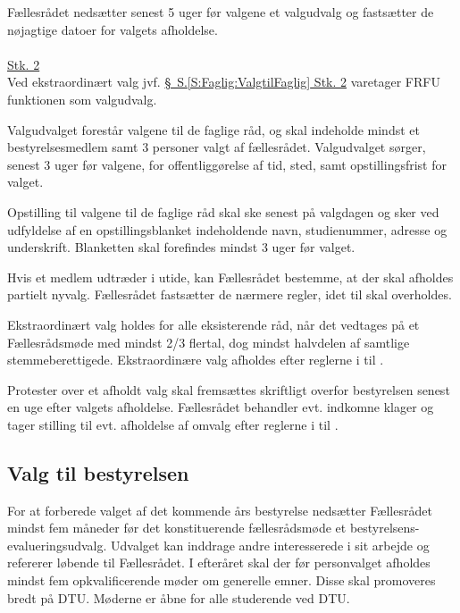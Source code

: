 \begin{list}
\item \label{S:Faglig:Valgudvalg} Fællesrådet nedsætter senest 5 uger før valgene et valgudvalg og fastsætter de nøjagtige datoer for valgets afholdelse.\\
\\
\underline{Stk. 2}\\
Ved ekstraordinært valg jvf. \hyperref[S:Faglig:ValgtilFaglig]{\S \ S.\ref*{S:Faglig:ValgtilFaglig} Stk. 2} varetager FRFU funktionen som valgudvalg.\\

\item Valgudvalget forestår valgene til de faglige råd, og skal indeholde mindst et bestyrelsesmedlem samt 3 personer valgt af fællesrådet. Valgudvalget sørger, senest 3 uger før valgene, for offentliggørelse af tid, sted, samt opstillingsfrist for valget.

\item \label{S:Faglig:Blanket} Opstilling til valgene til de faglige råd skal ske senest på valgdagen og sker ved udfyldelse af en opstillingsblanket indeholdende navn, studienummer, adresse og underskrift. Blanketten skal forefindes mindst 3 uger før valget.

\item Hvis et medlem udtræder i utide, kan Fællesrådet bestemme, at der skal afholdes partielt nyvalg. Fællesrådet fastsætter de nærmere regler, idet  til  skal overholdes.\\

\item Ekstraordinært valg holdes for alle eksisterende råd, når det vedtages på et Fællesrådsmøde med mindst 2/3 flertal, dog mindst halvdelen af samtlige stemmeberettigede. Ekstraordinære valg afholdes efter reglerne i  til .

\item Protester over et afholdt valg skal fremsættes skriftligt overfor bestyrelsen senest en uge efter valgets afholdelse. Fællesrådet behandler evt. indkomne klager og tager stilling til evt. afholdelse af omvalg efter reglerne i  til .


\subsection{Valg til bestyrelsen} \label{kap:ValgTilBestyrelsen}
\item \label{S:bestyrelsen:BXX-eu valg} For at forberede valget af det kommende års bestyrelse nedsætter Fællesrådet mindst fem måneder før det konstituerende fællesrådsmøde et bestyrelsens-evalueringsudvalg. Udvalget kan inddrage andre interesserede i sit arbejde og refererer løbende til Fællesrådet. I efteråret skal der før personvalget afholdes mindst fem opkvalificerende møder om generelle emner. Disse skal promoveres bredt på DTU. Møderne er åbne for alle studerende ved DTU.


\end{list}
